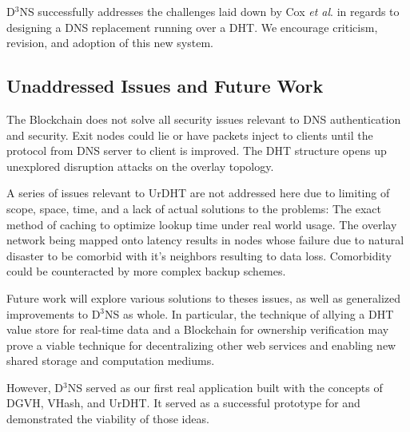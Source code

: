 D$^3$NS successfully addresses the challenges laid down by Cox \textit{et al}. \cite{cox2002serving}  in regards to designing a DNS replacement running over a DHT.   We encourage criticism, revision, and adoption of this new system.

\subsection{Unaddressed Issues and Future Work}
The Blockchain does not solve all security issues relevant to DNS authentication and security. Exit nodes could lie or have packets inject to clients until the protocol from DNS server to client is improved. The DHT structure opens up unexplored disruption attacks on the overlay topology.

A series of issues relevant to UrDHT are not addressed here due to limiting of scope, space, time, and a lack of actual solutions to the problems: The exact method of caching to optimize lookup time under real world usage. The overlay network being mapped onto latency results in nodes whose failure due to natural disaster to be comorbid with it's neighbors resulting to data loss. Comorbidity could be counteracted by more complex backup schemes.

Future work will explore various solutions to theses issues, as well as generalized improvements to D$^3$NS as whole.  In particular, the technique of allying a DHT value store for real-time data and a Blockchain for ownership verification may prove a viable technique for decentralizing other web services and enabling new shared storage and computation mediums.

However, D$^3$NS served as our first real application built with the concepts of DGVH, VHash, and UrDHT.
It served as a successful prototype for and demonstrated the viability of those ideas.
